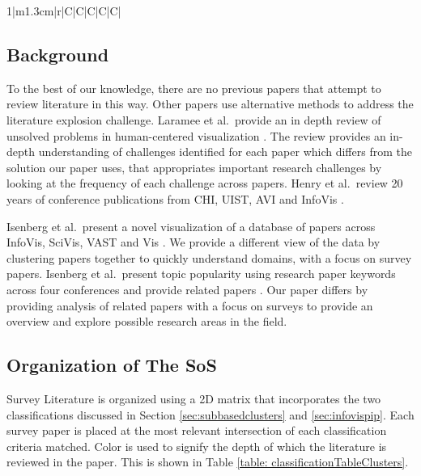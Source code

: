 \begin{table}[p]
\begin{tabularx}{1\textwidth}{|m{1.3cm}|r|C|C|C|C|C|}
\end{tabularx}
\caption{\scriptsize A 3-Dimensional hierarchical classification table depicting the categorization of all the survey papers. \colorbox{lime}{Green Highlighting} represents survey's summarised within the SoS. \colorbox{yellow}{Yellow Highlighting} represents surveys that were not summarised in detail due to prioritization of journals or size constraints. \colorbox{pink}{Pink Highlighting} represents survey's not reviewed in detail within the paper due to year constraints discussed in the Scope (Section \ref{sec:scope}). }\label{table: classificationTableClusters}
\end{table}

\subsection{Background}
To the best of our knowledge, there are no previous papers that attempt to review literature in this way. Other papers use alternative methods to address the literature explosion challenge. Laramee et al.\ provide an in depth review of unsolved problems in human-centered visualization \cite{laramee2007challenges}. The review provides an in-depth understanding of challenges identified for each paper which differs from the solution our paper uses, that appropriates important research challenges by looking at the frequency of each challenge across papers. Henry et al.\ review 20 years of conference publications from CHI, UIST, AVI and InfoVis \cite{henry200720}.

Isenberg et al.\ present a novel visualization of a database of papers across InfoVis, SciVis, VAST and Vis \cite{isenberg2017VPD}. We provide a different view of the data by clustering papers together to quickly understand domains, with a focus on survey papers. Isenberg et al.\ present topic popularity using research paper keywords across four conferences and provide related papers \cite{isenberg2017visualization}. Our paper differs by providing analysis of related papers with a focus on surveys to provide an overview and explore possible research areas in the field.

\subsection{Organization of The SoS} 
Survey Literature is organized using a 2D matrix that incorporates the two classifications discussed in Section \ref{sec:subbasedclusters} and \ref{sec:infovispip}. Each survey paper is placed at the most relevant intersection of each classification criteria matched. Color is used to signify the depth of which the literature is reviewed in the paper. This is shown in Table \ref{table: classificationTableClusters}.

